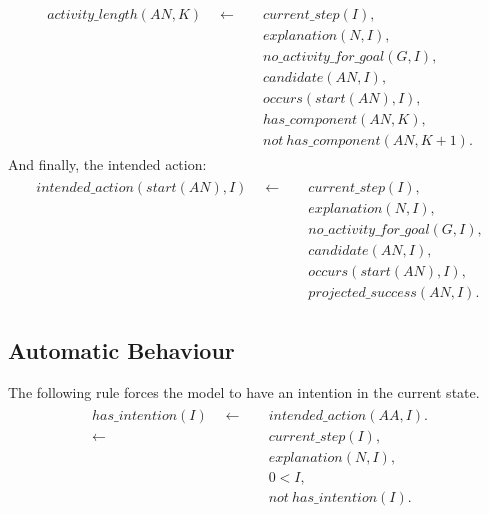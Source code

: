 \documentclass[11pt, oneside]{article}
\begin{document}
\begin{align}\begin{split}
activity\_length(AN,K) \quad \leftarrow \quad &current\_step(I),\\
&explanation(N,I),\\
&no\_activity\_for\_goal(G,I),\\
&candidate(AN,I),\\
&occurs(start(AN),I),\\
&has\_component(AN,K),\\
&not\ has\_component(AN,K+1).
\end{split}\end{align}
And finally, the intended action:
\begin{align}\begin{split}
intended\_action(start(AN),I)\quad \leftarrow \quad &current\_step(I),\\
&explanation(N,I),\\
&no\_activity\_for\_goal(G,I),\\
&candidate(AN,I),\\
&occurs(start(AN),I),\\
&projected\_success(AN,I).
\end{split}\end{align}

\subsection{Automatic Behaviour}
The following rule  forces the model to have an intention in the current state.
\begin{align}\begin{split}
has\_intention(I)\quad \leftarrow \quad &intended\_action(AA,I).\\
\leftarrow \quad &current\_step(I),\\ &explanation(N,I),\\&0<I,\\ &not\ has\_intention(I).
\end{split}\end{align}
 
 

%
%
 
 
 
\end{document}
